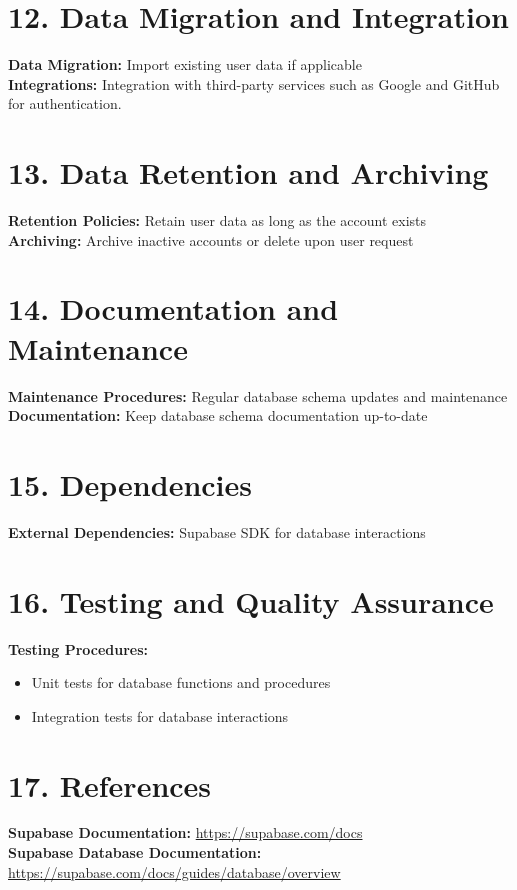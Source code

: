 \documentclass{article}
\begin{document}
\section*{12. Data Migration and Integration}
\textbf{Data Migration:} Import existing user data if applicable \\
\textbf{Integrations:} Integration with third-party services such as Google and GitHub for authentication.

\section*{13. Data Retention and Archiving}
\textbf{Retention Policies:} Retain user data as long as the account exists \\
\textbf{Archiving:} Archive inactive accounts or delete upon user request

\section*{14. Documentation and Maintenance}
\textbf{Maintenance Procedures:} Regular database schema updates and maintenance \\
\textbf{Documentation:} Keep database schema documentation up-to-date

\section*{15. Dependencies}
\textbf{External Dependencies:} Supabase SDK for database interactions

\section*{16. Testing and Quality Assurance}
\textbf{Testing Procedures:}
\begin{itemize}[label=--]
    \item Unit tests for database functions and procedures
    \item Integration tests for database interactions
\end{itemize}

\section*{17. References}
\textbf{Supabase Documentation:} \url{https://supabase.com/docs} \\
\textbf{Supabase Database Documentation:} \url{https://supabase.com/docs/guides/database/overview}
\end{document}
